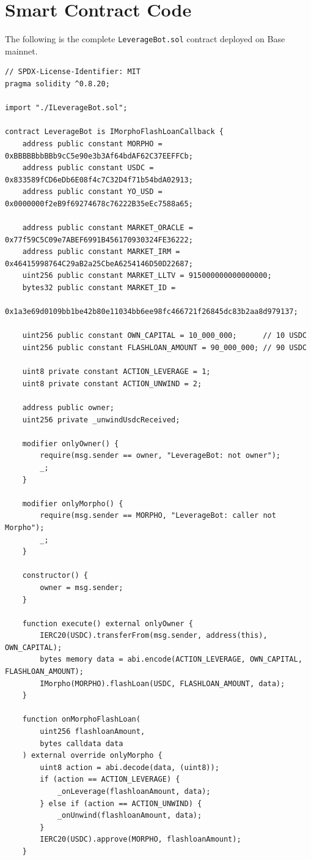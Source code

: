 \section{Smart Contract Code}
\label{sec:code}

The following is the complete \texttt{LeverageBot.sol} contract deployed on Base mainnet.

\begin{verbatim}
// SPDX-License-Identifier: MIT
pragma solidity ^0.8.20;

import "./ILeverageBot.sol";

contract LeverageBot is IMorphoFlashLoanCallback {
    address public constant MORPHO = 0xBBBBBbbBBb9cC5e90e3b3Af64bdAF62C37EEFFCb;
    address public constant USDC = 0x833589fCD6eDb6E08f4c7C32D4f71b54bdA02913;
    address public constant YO_USD = 0x0000000f2eB9f69274678c76222B35eEc7588a65;

    address public constant MARKET_ORACLE = 0x77f59C5C09e7ABEF6991B456170930324FE36222;
    address public constant MARKET_IRM = 0x46415998764C29aB2a25CbeA6254146D50D22687;
    uint256 public constant MARKET_LLTV = 915000000000000000;
    bytes32 public constant MARKET_ID = 
        0x1a3e69d0109bb1be42b80e11034bb6ee98fc466721f26845dc83b2aa8d979137;

    uint256 public constant OWN_CAPITAL = 10_000_000;      // 10 USDC
    uint256 public constant FLASHLOAN_AMOUNT = 90_000_000; // 90 USDC

    uint8 private constant ACTION_LEVERAGE = 1;
    uint8 private constant ACTION_UNWIND = 2;

    address public owner;
    uint256 private _unwindUsdcReceived;

    modifier onlyOwner() {
        require(msg.sender == owner, "LeverageBot: not owner");
        _;
    }

    modifier onlyMorpho() {
        require(msg.sender == MORPHO, "LeverageBot: caller not Morpho");
        _;
    }

    constructor() {
        owner = msg.sender;
    }

    function execute() external onlyOwner {
        IERC20(USDC).transferFrom(msg.sender, address(this), OWN_CAPITAL);
        bytes memory data = abi.encode(ACTION_LEVERAGE, OWN_CAPITAL, FLASHLOAN_AMOUNT);
        IMorpho(MORPHO).flashLoan(USDC, FLASHLOAN_AMOUNT, data);
    }

    function onMorphoFlashLoan(
        uint256 flashloanAmount,
        bytes calldata data
    ) external override onlyMorpho {
        uint8 action = abi.decode(data, (uint8));
        if (action == ACTION_LEVERAGE) {
            _onLeverage(flashloanAmount, data);
        } else if (action == ACTION_UNWIND) {
            _onUnwind(flashloanAmount, data);
        }
        IERC20(USDC).approve(MORPHO, flashloanAmount);
    }


\end{verbatim}
